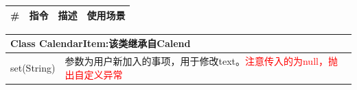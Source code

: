 \documentclass[UTF8,a4paper,12pt,fontset=fandol]{ctexart}%
\begin{document}
\begin{center}
	\begin{longtable}{|p{1cm}|p{2cm}|p{3cm}|p{4cm}|}
		\hline
		\#&指令&描述&使用场景\\ \hline \hline
		\endhead
	\end{longtable}
\end{center}

\begin{center}
	\begin{tabular}{|p{5cm}|p{6cm}|}
		\hline
		\multicolumn{2}{|p{11cm}|}{\textbf{Class  CalendarItem:}该类继承自Calend}\\ \hline
		set(String)& 参数为用户新加入的事项，用于修改text。\textcolor{red}{注意传入的为null，抛出自定义异常}\\ \hline
	\end{tabular}
\end{center}

\newpage
{}
\end{document}

